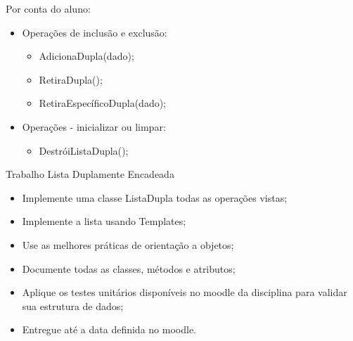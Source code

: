 \documentclass[12pt,table,xcolor={dvipsnames}]{beamer}
\begin{document}
\begin{frame}[fragile]{Por conta do aluno:}

\begin{itemize}
\item Operações de inclusão e exclusão:
\begin{itemize}
\item AdicionaDupla(dado);
\item RetiraDupla();
\item RetiraEspecíficoDupla(dado);
\end{itemize}
\item Operações - inicializar ou limpar:
\begin{itemize}
\item DestróiListaDupla();
\end{itemize}
\end{itemize}
\end{frame}

\begin{frame}[fragile]{Trabalho Lista Duplamente Encadeada}
\begin{itemize}
\item Implemente uma classe ListaDupla todas as operações vistas;
\item Implemente a lista usando Templates;
\item Use as melhores práticas de orientação a objetos;
\item Documente todas as classes, métodos e atributos;
\item Aplique os testes unitários disponíveis no moodle da disciplina para validar sua estrutura de dados;
\item Entregue até a data definida no moodle.
\end{itemize}
\end{frame}

\fi
\end{document}
